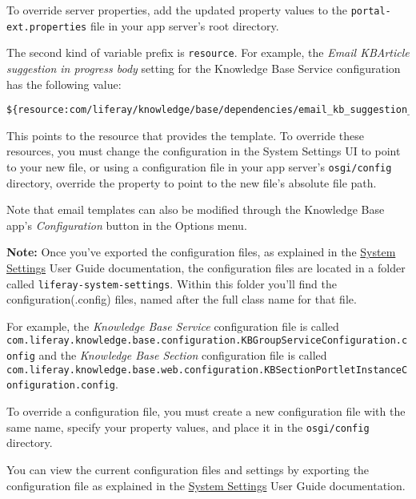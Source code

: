 To override server properties, add the updated property values to the
\texttt{portal-ext.properties} file in your app server's root directory.

The second kind of variable prefix is \texttt{resource}. For example,
the \emph{Email KBArticle suggestion in progress body} setting for the
Knowledge Base Service configuration has the following value:

\begin{verbatim}
${resource:com/liferay/knowledge/base/dependencies/email_kb_suggestion_in_progress_body.tmpl}
\end{verbatim}

This points to the resource that provides the template. To override
these resources, you must change the configuration in the System
Settings UI to point to your new file, or using a configuration file in
your app server's \texttt{osgi/config} directory, override the property
to point to the new file's absolute file path.

Note that email templates can also be modified through the Knowledge
Base app's \emph{Configuration} button in the Options menu.

\noindent\hrulefill

\textbf{Note:} Once you've exported the configuration files, as
explained in the
\href{/docs/7-0/user/-/knowledge_base/u/system-settings\#exporting-and-importing-configurations}{System
Settings} User Guide documentation, the configuration files are located
in a folder called \texttt{liferay-system-settings}. Within this folder
you'll find the configuration(.config) files, named after the full class
name for that file.

For example, the \emph{Knowledge Base Service} configuration file is
called
\texttt{com.liferay.knowledge.base.configuration.KBGroupServiceConfiguration.config}
and the \emph{Knowledge Base Section} configuration file is called
\texttt{com.liferay.knowledge.base.web.configuration.KBSectionPortletInstanceConfiguration.config}.

To override a configuration file, you must create a new configuration
file with the same name, specify your property values, and place it in
the \texttt{osgi/config} directory.

\noindent\hrulefill

You can view the current configuration files and settings by exporting
the configuration file as explained in the
\href{/docs/7-0/user/-/knowledge_base/u/system-settings\#exporting-and-importing-configurations}{System
Settings} User Guide documentation.

